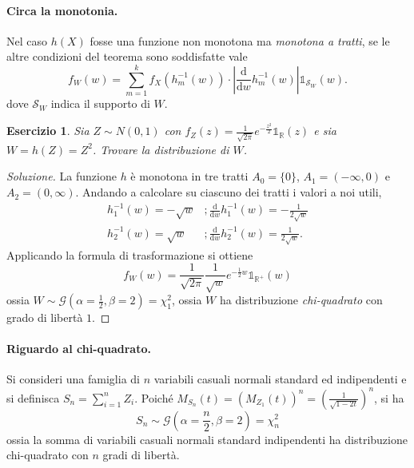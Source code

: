 \documentclass[fontsize=11pt,paper=A4,oneside,index=totoc,hyperref]{book}
\theoremstyle{definition}
\theoremstyle{plain}
\newtheorem{exe}{Esercizio}[section]
\newcommand{\Ind}[1]{\mathbb{1}_{#1}}
\begin{document}
\paragraph{Circa la monotonia.} Nel caso \(h(X)\) fosse una funzione non monotona ma \emph{monotona a tratti}, se le altre condizioni del teorema sono soddisfatte vale
\begin{equation}
  f_W(w) = \sum_{m=1}^k f_X(h_m^{-1}(w))\cdot\left\lvert\frac{\mathrm{d}}{\mathrm{d}w}h_m^{-1}(w)\right\rvert \Ind{\mathcal{S}_W}(w).
\end{equation}
dove \(\mathcal{S}_W\) indica il supporto di \(W\).

\begin{exe}
  Sia \(Z \sim N(0,1)\) con \(f_Z(z) = \tfrac{1}{\sqrt{2\pi}}e^{-\tfrac{z^2}{2}}\Ind{\mathbb{R}}(z)\) e sia \(W = h(Z) = Z^2\). Trovare la distribuzione di \(W\).
\end{exe}
\begin{proof}[Soluzione]
  La funzione \(h\) è monotona in tre tratti \(A_0 = \lbrace 0 \rbrace\), \(A_1 = (-\infty,0)\) e \(A_2 = (0,\infty)\). Andando a calcolare su ciascuno dei tratti i valori a noi utili,
  \begin{align*}
    h_1^{-1}(w) = -\sqrt{w}&; \frac{\mathrm{d}}{\mathrm{d}w}h_1^{-1}(w) = -\frac{1}{2\sqrt{w}} \\
    h_2^{-1}(w) = \sqrt{w}&; \frac{\mathrm{d}}{\mathrm{d}w}h_2^{-1}(w) = \frac{1}{2\sqrt{w}}.
  \end{align*}
  Applicando la formula di trasformazione si ottiene
  \[
  f_W(w) = \frac{1}{\sqrt{2\pi}}\frac{1}{\sqrt{w}}e^{-\frac12 w}\Ind{\mathbb{R}^+}(w)
  \]
  ossia \(W \sim \mathcal{G}(\alpha = \frac12, \beta = 2) = \chi_1^2\), ossia \(W\) ha distribuzione \emph{chi-quadrato} con grado di libertà \(1\).
\end{proof}
\paragraph{Riguardo al chi-quadrato.} Si consideri una famiglia di \(n\) variabili casuali normali standard ed indipendenti e si definisca \(S_n = \sum_{i=1}^n Z_i\). Poiché \(M_{S_n}(t) = (M_{Z_1}(t))^n = \left(\tfrac{1}{\sqrt{1-2t}}\right)^n\), si ha
\begin{equation}
  S_n \sim \mathcal{G}(\alpha = \frac{n}{2}, \beta = 2) = \chi_n^2
\end{equation}
ossia la somma di variabili casuali normali standard indipendenti ha distribuzione chi-quadrato con \(n\) gradi di libertà.
\end{document}
